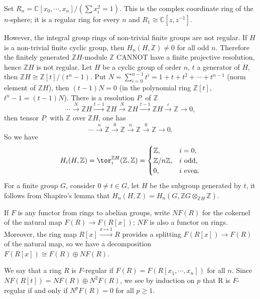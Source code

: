 Set $R_n=\mathbb{C}[x_0,\cdots,x_n]/(\sum x_i^2=1)$. This is the complex coordinate ring of the $n$-sphere; it is a regular ring for every $n$ and $R_1\cong \mathbb{C}[z,z^{-1}]$.

However, the integral group rings of non-trivial finite groups are not regular. If $H$ is a non-trivial finite cyclic group, then $H_n(H,\mathbb{Z})\neq 0$ for all odd $n$. Therefore the finitely generated $\mathbb{Z}H$-module $\mathbb{Z}$ CANNOT have a finite projective resolution, hence $\mathbb{Z}H$ is not regular. 
Let $H$ be a cyclic group of order $n$, $t$ a generator of $H$, then $\mathbb{Z}H\cong \mathbb{Z}[t]/(t^n-1)$. Put $N=\sum_{i=0}^{n-1}t^i = 1+t+t^2+\cdots+t^{n-1}$ (norm element of $\mathbb{Z}H$), then $(t-1)N=0$ (in the polynomial ring $\mathbb{Z}[t]$, $t^n-1=(t-1)N$). There is a resolution $P_{\cdot}$ of $\mathbb{Z}$
\[\cdots \overset{N}\longrightarrow \mathbb{Z}H \overset{t-1}\longrightarrow \mathbb{Z}H \overset{N}\longrightarrow \mathbb{Z}H \overset{t-1}\longrightarrow \mathbb{Z}H\overset{\varepsilon}\longrightarrow \mathbb{Z} \longrightarrow 0,\]
then tensor $P_\cdot$ with $\mathbb{Z}$ over $\mathbb{Z}H$, one has
\[\cdots \overset{n}\longrightarrow \mathbb{Z} \overset{0}\longrightarrow \mathbb{Z} \overset{n}\longrightarrow \mathbb{Z} \overset{0}\longrightarrow \mathbb{Z} \longrightarrow 0.\]
So we have
\begin{equation*}
H_i(H,\mathbb{Z})=\tor_i^{\mathbb{Z}H}(\mathbb{Z},\mathbb{Z})=\begin{cases}
	\mathbb{Z},&i=0,\\
	\mathbb{Z}/n\mathbb{Z},& i \text{ odd,}\\
	0,& i \text{ even.}
\end{cases}
\end{equation*}
For a finite group $G$, consider $0\neq t \in G$, let $H$ be the subgroup generated by $t$, it follows from Shapiro's lemma that $H_n(H,\mathbb{Z})=H_n(G,\mathbb{Z}G\otimes_{\mathbb{Z}H}\mathbb{Z})$.
\begin{definition}
	If $F$ is any functor from rings to abelian groups, write $NF(R)$ for the cokernel of the natural map $F(R) \longrightarrow F(R[x])$; $NF$ is also a functor on rings. Moreover, the ring map $R[x] \overset{x\mapsto 1}\longrightarrow R$ provides a splitting $F(R[x]) \longrightarrow F(R)$ of the natural map, so we have a decomposition $F(R[x]) \cong F(R) \oplus NF(R)$.

	We say that a ring $R$ is $F$-regular if $F(R) = F(R[x_1,\cdots,x_n])$ for all $n$. Since $NF(R[t]) = NF(R) \oplus N^2 F(R)$, we see by induction on $p$ that R is $F$-regular if and only if $N^p F(R) = 0$ for all $p \geq 1$.
\end{definition}
